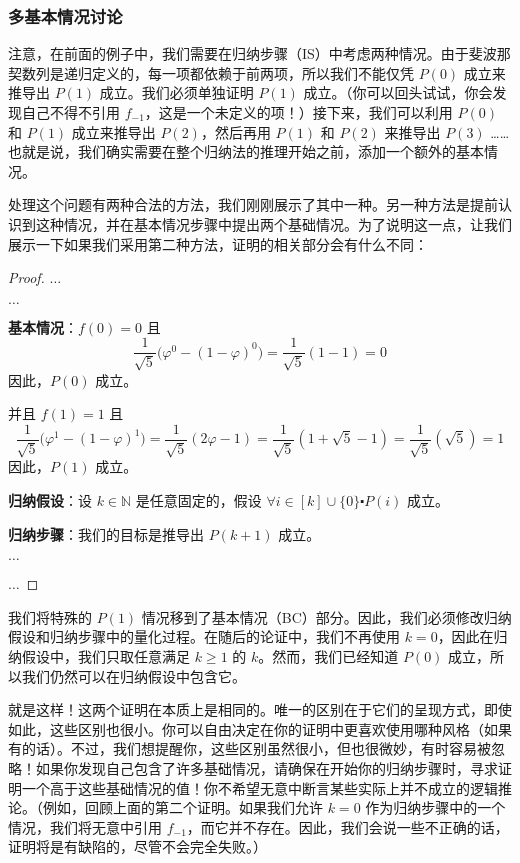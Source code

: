 \subsubsection*{多基本情况讨论}

注意，在前面的例子中，我们需要在归纳步骤（IS）中考虑两种情况。由于斐波那契数列是递归定义的，每一项都依赖于前两项，所以我们不能仅凭 $P(0)$ 成立来推导出 $P(1)$ 成立。我们必须单独证明 $P(1)$ 成立。（你可以回头试试，你会发现自己不得不引用 $f_{-1}$，这是一个未定义的项！）接下来，我们可以利用 $P(0)$ 和 $P(1)$ 成立来推导出 $P(2)$，然后再用 $P(1)$ 和 $P(2)$ 来推导出 $P(3)$ ……也就是说，我们确实需要在整个归纳法的推理开始之前，添加一个额外的基本情况。

处理这个问题有两种合法的方法，我们刚刚展示了其中一种。另一种方法是提前认识到这种情况，并在基本情况步骤中提出两个基础情况。为了说明这一点，让我们展示一下如果我们采用第二种方法，证明的相关部分会有什么不同：

\begin{proof}

    $\dots$

    $\dots$

    \textbf{基本情况}：$f(0) = 0$ 且
    \[\frac{1}{\sqrt{5}}\big(\varphi^0-(1-\varphi)^0\big) = \frac{1}{\sqrt{5}} (1-1) = 0\]
    因此，$P(0)$ 成立。

    并且 $f(1) = 1$ 且
    \[\frac{1}{\sqrt{5}}\big(\varphi^1-(1-\varphi)^1\big) = \frac{1}{\sqrt{5}} (2\varphi-1) = \frac{1}{\sqrt{5}} (1+\sqrt{5}-1) = \frac{1}{\sqrt{5}} (\sqrt{5}) = 1\]
    因此，$P(1)$ 成立。

    \textbf{归纳假设}：设 $k \in \mathbb{N}$ 是任意固定的，假设 $\forall i \in [k] \cup \{0\} \centerdot P(i)$ 成立。

    \textbf{归纳步骤}：我们的目标是推导出 $P(k+1)$ 成立。

    $\dots$

    $\dots$
\end{proof}

我们将特殊的 $P(1)$ 情况移到了基本情况（BC）部分。因此，我们必须修改归纳假设和归纳步骤中的量化过程。在随后的论证中，我们不再使用 $k = 0$，因此在归纳假设中，我们只取任意满足 $k \ge 1$ 的 $k$。然而，我们已经知道 $P(0)$ 成立，所以我们仍然可以在归纳假设中包含它。

就是这样！这两个证明在本质上是相同的。唯一的区别在于它们的呈现方式，即使如此，这些区别也很小。你可以自由决定在你的证明中更喜欢使用哪种风格（如果有的话）。不过，我们想提醒你，这些区别虽然很小，但也很微妙，有时容易被忽略！如果你发现自己包含了许多基础情况，请确保在开始你的归纳步骤时，寻求证明一个高于这些基础情况的值！你不希望无意中断言某些实际上并不成立的逻辑推论。（例如，回顾上面的第二个证明。如果我们允许 $k = 0$ 作为归纳步骤中的一个情况，我们将无意中引用 $f_{-1}$，而它并不存在。因此，我们会说一些不正确的话，证明将是有缺陷的，尽管不会完全失败。）

